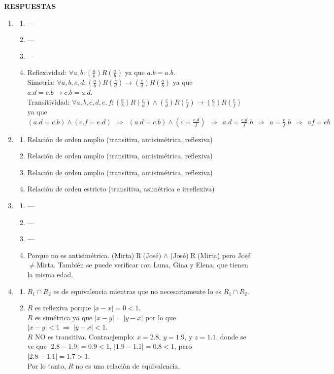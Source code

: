 \documentclass[a4paper]{article}
\newcommand{\exercise}{\item}
\newcommand{\Then}{\Rightarrow}
\begin{document}
 \textbf{RESPUESTAS}\begin{enumerate}\exercise\begin{enumerate} [label=(\alph*)]\item ---\item ---\item ---		\item Reflexividad: $\forall a,b:  \left(\frac{a}{b}\right) R \left(\frac{a}{b}\right)$ ya que $a.b=a.b$. \\ Simetría: $\forall a,b,c,d: \left(\frac{a}{b}\right) R \left(\frac{c}{d}\right) \to \left(\frac{c}{d}\right) R \left(\frac{a}{b}\right)$ ya que $a.d=c.b \to c.b=a.d$. \\ Transitividad: $\forall a,b,c,d,e,f:  \left(\frac{a}{b}\right) R \left(\frac{c}{d}\right) \land \left(\frac{c}{d}\right) R \left(\frac{e}{f}\right) \to \left(\frac{a}{b}\right) R \left(\frac{e}{f}\right)$ \\ ya que $(a.d=c.b) \land (c.f=e.d) ~~\Then~~ (a.d=c.b) \land (c=\frac{e.d}{f}) ~~\Then~~ a.d=\frac{e.d}{f}.b ~~\Then~~ a=\frac{e}{f}.b ~~\Then~~ af=eb$
\end{enumerate}\exercise\begin{enumerate} [label=(\alph*)]		\item Relación de orden amplio (transitiva, antisimétrica, reflexiva) 
		\item Relación de orden amplio (transitiva, antisimétrica, reflexiva)
		\item Relación de orden amplio (transitiva, antisimétrica, reflexiva)
		\item Relación de orden estricto (transitiva, asimétrica e irreflexiva)
\end{enumerate}\exercise\begin{enumerate} [label=(\alph*)]\item ---\item ---\item ---		\item Porque no es antisimétrica. (Mirta)$\mathrel{R}$(José) $\land$ (José)$\mathrel{R}$(Mirta) pero José$\neq$Mirta. También se puede verificar con Luna, Gina y Elena, que tienen la misma edad.
\end{enumerate}\exercise\begin{enumerate} [label=(\alph*)]		\item $R_1 \cap R_2$ es de equivalencia mientras que no necesariamente lo es $R_1 \cap R_2$.
		\item $R$ es reflexiva porque $|x - x| = 0 < 1$. \\ $R$ es simétrica ya que $|x - y|=|y - x|$ por lo que $|x-y|<1 ~\Then~ |y - x| < 1$. \\ $R$ NO es transitiva. Contraejemplo: $x = 2.8$, $y = 1.9$, y $z = 1.1$, donde se ve que $|2.8-1.9|=0.9<1$, $|1.9-1.1|=0.8<1$, pero $|2.8-1.1|=1.7>1$. \\ Por lo tanto, $R$ no es una relación de equivalencia.

\end{enumerate}
\end{enumerate}
\end{document}
